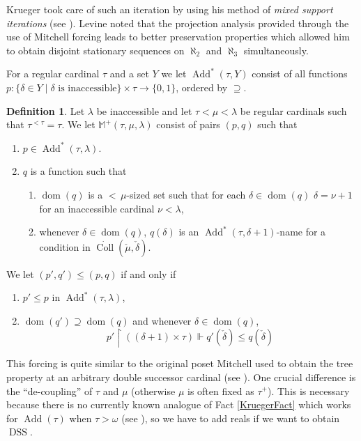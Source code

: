 \documentclass[12pt]{amsart}
\theoremstyle{definition}
\newtheorem{mydef}{Definition}[section]
\theoremstyle{remark}
\theoremstyle{plain}
\numberwithin{mydef}{section}
\DeclareMathOperator{\dom}{dom}
\DeclareMathOperator{\Add}{Add}
\DeclareMathOperator{\Coll}{Coll}
\DeclareMathOperator{\DSS}{DSS}
\newcommand{\dM}{\mathbb{M}}
\newcommand{\uhr}{\upharpoonright}
\begin{document}
	Krueger took care of such an iteration by using his method of \emph{mixed support iterations} (see \cite{KruegerMitchellStyle}). Levine noted that the projection analysis provided through the use of Mitchell forcing leads to better preservation properties which allowed him to obtain disjoint stationary sequences on $\aleph_2$ and $\aleph_3$ simultaneously.
	
	For a regular cardinal $\tau$ and a set $Y$ we let $\Add^*(\tau,Y)$ consist of all functions $p\colon\{\delta\in Y\;|\;\delta\text{ is inaccessible}\}\times\tau\to\{0,1\}$, ordered by $\supseteq$.
	
	\begin{mydef}
		Let $\lambda$ be inaccessible and let $\tau<\mu<\lambda$ be regular cardinals such that $\tau^{<\tau}=\tau$. We let $\dM^+(\tau,\mu,\lambda)$ consist of pairs $(p,q)$ such that
		\begin{enumerate}
			\item $p\in\Add^*(\tau,\lambda)$.
			\item $q$ is a function such that
			\begin{enumerate}
				\item $\dom(q)$ is a ${<}\,\mu$-sized set such that for each $\delta\in\dom(q)$ $\delta=\nu+1$ for an inaccessible cardinal $\nu<\lambda$,
				\item whenever $\delta\in\dom(q)$, $q(\delta)$ is an $\Add^*(\tau,\delta+1)$-name for a condition in $\dot{\Coll}(\check{\mu},\check{\delta})$.
			\end{enumerate}
		\end{enumerate}
		We let $(p',q')\leq(p,q)$ if and only if
		\begin{enumerate}
			\item $p'\leq p$ in $\Add^*(\tau,\lambda)$,
			\item $\dom(q')\supseteq\dom(q)$ and whenever $\delta\in\dom(q)$,
			$$p'\uhr((\delta+1)\times\tau)\Vdash q'(\check{\delta})\leq q(\check{\delta})$$
		\end{enumerate}
	\end{mydef}
	
	This forcing is quite similar to the original poset Mitchell used to obtain the tree property at an arbitrary double successor cardinal (see \cite{MitchellTreeProp}). One crucial difference is the ``de-coupling'' of $\tau$ and $\mu$ (otherwise $\mu$ is often fixed as $\tau^+$). This is necessary because there is no currently known analogue of Fact \ref{KruegerFact} which works for $\Add(\tau)$ when $\tau>\omega$ (see \cite[Question 12.6]{KruegerApplicMSI}), so we have to add reals if we want to obtain $\DSS$.
	
\end{document}
